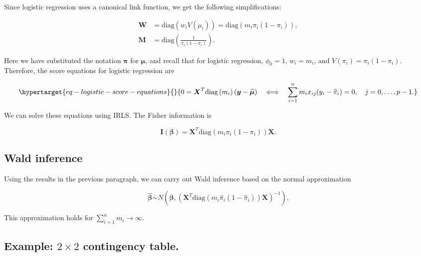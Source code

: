 \documentclass[
  11pt,
  letterpaper,
  oneside]{book}
\theoremstyle{definition}
\theoremstyle{plain}
\theoremstyle{plain}
\theoremstyle{plain}
\theoremstyle{remark}
\begin{document}
Since logistic regression uses a canonical link function, we get the
following simplifications:

\[
\begin{aligned}
\boldsymbol{W} &= \text{diag}\left(w_i V(\mu_i)\right) = \text{diag}\left(m_i \pi_i(1-\pi_i)\right), \\
\boldsymbol{M} &= \text{diag}\left(\frac{1}{\pi_i(1-\pi_i)}\right).
\end{aligned}
\]

Here we have substituted the notation \(\boldsymbol{\pi}\) for
\(\boldsymbol{\mu}\), and recall that for logistic regression,
\(\phi_0 = 1\), \(w_i = m_i\), and \(V(\pi_i) = \pi_i(1-\pi_i)\).
Therefore, the score equations for logistic regression are

\begin{equation}\protect\hypertarget{eq-logistic-score-equations}{}{
0 = \boldsymbol{X}^T \text{diag}\left(m_i\right)(\boldsymbol{y} - \boldsymbol{\widehat{\mu}}) \quad \Longleftrightarrow \quad \sum_{i = 1}^n m_i x_{ij}(y_i-\widehat{\pi}_i) = 0, \quad j = 0, \dots, p-1.
}\label{eq-logistic-score-equations}\end{equation}

We can solve these equations using IRLS. The Fisher information is

\[
\boldsymbol{I}(\boldsymbol{\beta}) = \boldsymbol{X}^T \text{diag}\left(m_i \pi_i(1-\pi_i)\right) \boldsymbol{X}.
\]

\hypertarget{sec-wald-inference}{%
\subsection{Wald inference}\label{sec-wald-inference}}

Using the results in the previous paragraph, we can carry out Wald
inference based on the normal approximation

\[
\boldsymbol{\widehat \beta} \overset \cdot \sim N\left(\boldsymbol \beta, \left(\boldsymbol X^T\text{diag}(m_i \widehat \pi_i(1-\widehat \pi_i))\boldsymbol X\right)^{-1}\right).
\]

This approximation holds for \(\sum_{i = 1}^n m_i \rightarrow \infty\).

\hypertarget{sec-2x2-contingency-table}{%
\subsection{\texorpdfstring{Example: \(2 \times 2\) contingency
table.}{Example: 2 \textbackslash times 2 contingency table.}}\label{sec-2x2-contingency-table}}
\end{document}
